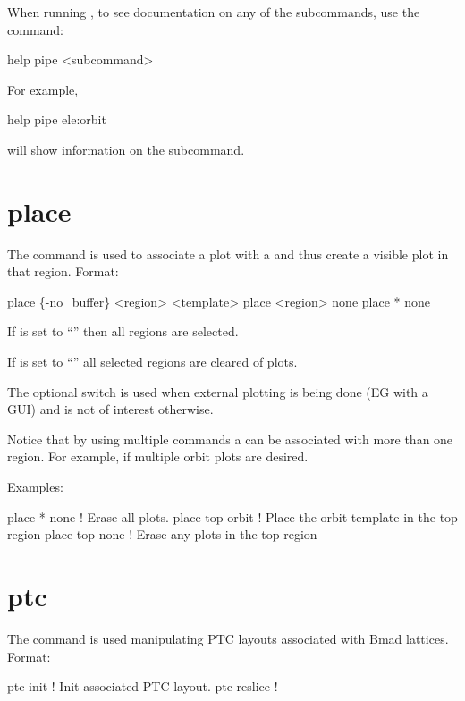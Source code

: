 When running \tao, to see documentation on any of the subcommands, use the command:
\begin{example}
  help pipe <subcommand>
\end{example}
For example, 
\begin{example}
  help pipe ele:orbit
\end{example}
will show information on the  subcommand.

\section{place}
\label{s:place}

The  command is used to associate a  plot with a  and thus
create a visible plot in that region. Format:
\begin{example}
  place \{-no_buffer\} <region> <template>
  place <region> none
  place * none
\end{example}

\vskip 10pt 
If  is set to ``\vn{*}'' then all regions are selected.

If  is set to ``'' all selected regions are cleared of plots.

The  optional switch is used when external plotting is being done (EG with a GUI) and
is not of interest otherwise.

Notice that by using multiple  commands a  can be associated with more than
one region. For example, if multiple orbit plots are desired.

Examples:
\begin{example}
  place * none     ! Erase all plots.
  place top orbit  ! Place the orbit template in the top region
  place top none   ! Erase any plots in the top region
\end{example}

\section{ptc}
\label{s:ptc}

The  command is used manipulating PTC layouts associated with Bmad
lattices. Format:
\begin{example}
  ptc init            ! Init associated PTC layout.
  ptc reslice         !
\end{example}

